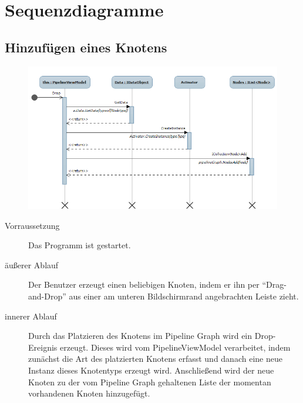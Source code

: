 \section{Sequenzdiagramme}

\subsection{Hinzufügen eines Knotens}
\begin{figure}[h!]
\begin{center}
\includegraphics[width=0.8\textheight,angle=90]{Diagrams/drop.png}
\end{center}
\end{figure}
\newpage

\begin{description}
	\item[Vorraussetzung] Das Programm ist gestartet.
	\item[äußerer Ablauf] Der Benutzer erzeugt einen beliebigen Knoten, indem er ihn per ``Drag-and-Drop'' aus einer am unteren Bildschirmrand angebrachten Leiste zieht.
	\item[innerer Ablauf] Durch das Platzieren des Knotens im Pipeline Graph wird ein Drop-Ereignis erzeugt. Dieses wird vom PipelineViewModel verarbeitet, indem zunächst die Art des platzierten Knotens erfasst und danach eine neue Instanz dieses Knotentyps erzeugt wird. Anschließend wird der neue Knoten zu der vom Pipeline Graph gehaltenen Liste der momentan vorhandenen Knoten hinzugefügt.
\end{description}
\newpage
